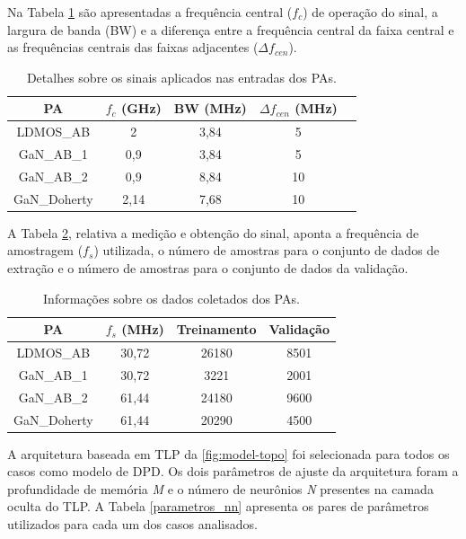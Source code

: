 Na Tabela \ref{sinais_med1} são apresentadas a frequência central ($f_{c}$) de operação do sinal, a largura de banda (BW) e a diferença entre a frequência central da faixa central e as frequências centrais das faixas adjacentes ($\Delta f_{cen}$).
\begin{table}[!tbh]
\centering
\caption{Detalhes sobre os sinais aplicados nas entradas dos PAs.}
\begin{tabular}{|c|c|c|c|c|}
\hline
\rule[-1ex]{0pt}{2.5ex} \textbf{PA} & \textbf{$f_{c}$ (GHz)} & \textbf{BW (MHz)} & \textbf{$\Delta f_{cen}$ (MHz)}\\ 
\hline 
\rule[-1ex]{0pt}{2.5ex} LDMOS{\_}AB  & 2 & 3,84 & 5\\ 
\hline
\rule[-1ex]{0pt}{2.5ex} GaN{\_}AB{\_}1  & 0,9 & 3,84 & 5\\ 
\hline 
\rule[-1ex]{0pt}{2.5ex} GaN{\_}AB{\_}2 & 0,9 & 8,84 & 10\\ 
\hline 
\rule[-1ex]{0pt}{2.5ex} GaN{\_}Doherty & 2,14 & 7,68 & 10\\
\hline
\end{tabular} 
\label{sinais_med1}
\end{table}

A Tabela \ref{sinais_med2}, relativa a medição e obtenção do sinal, aponta a frequência de amostragem ($f_{s}$) utilizada, o número de amostras para o conjunto de dados de extração e o número de amostras para o conjunto de dados da validação.
\begin{table}[!tbh]
\centering
\caption{Informações sobre os dados coletados dos PAs.}
\begin{tabular}{|c|c|c|c|}
\hline
\rule[-1ex]{0pt}{2.5ex} \textbf{PA} & \textbf{$f_{s}$ (MHz)} & \textbf{Treinamento} & \textbf{Validação} \\ 
\hline
\rule[-1ex]{0pt}{2.5ex} LDMOS{\_}AB  & 30,72 & 26180 & 8501 \\ 
\hline
\rule[-1ex]{0pt}{2.5ex} GaN{\_}AB{\_}1  & 30,72 & 3221 & 2001 \\ 
\hline 
\rule[-1ex]{0pt}{2.5ex} GaN{\_}AB{\_}2 & 61,44 & 24180 & 9600 \\ 
\hline 
\rule[-1ex]{0pt}{2.5ex} GaN{\_}Doherty & 61,44 & 20290 & 4500 \\
\hline
\end{tabular} 
\label{sinais_med2}
\end{table}

A arquitetura baseada em TLP da \autoref{fig:model-topo} foi selecionada para todos os casos como modelo de DPD. Os dois parâmetros de ajuste da arquitetura foram a profundidade de memória \textit{M} e o número de neurônios \textit{N} presentes na camada oculta do TLP. A Tabela \ref{parametros_nn} apresenta os pares de parâmetros utilizados para cada um dos casos analisados.

